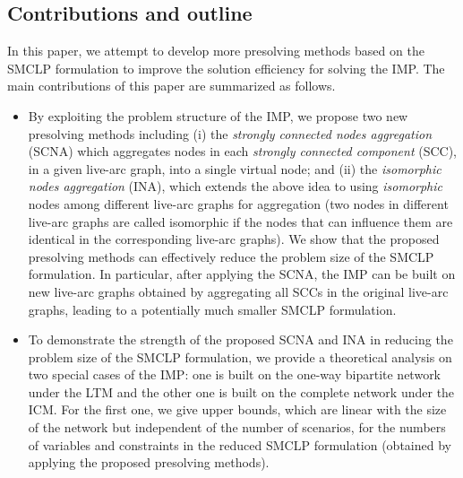 \documentclass[a4paper,10pt]{article}
\theoremstyle{plain}
\newcommand{\revv}[1]{{#1}}
\begin{document}
	
	
	\subsection{Contributions and outline}
	In this paper, we attempt to develop more presolving methods based on the SMCLP formulation to improve the solution efficiency for solving the IMP. 
	The main contributions of this paper are summarized as follows.
	\begin{itemize}
		\item 
		By exploiting the problem structure of the IMP, we propose two new presolving methods including (i) the \emph{strongly connected nodes aggregation} (SCNA) which aggregates nodes in each \emph{strongly connected component} (SCC), in a given live-arc graph, into a single virtual node; 
		and (ii) the \emph{isomorphic nodes aggregation} (INA), which extends the above idea to using \emph{isomorphic} nodes among different live-arc graphs for aggregation (two nodes in different live-arc graphs are called isomorphic if the nodes that can influence them are identical in the corresponding live-arc graphs).
		We show that the proposed presolving methods can effectively reduce the problem size of the SMCLP formulation. 
		In particular, after applying the SCNA, the IMP can be built on new live-arc graphs obtained by aggregating all SCCs in the original live-arc graphs, leading to a potentially much smaller SMCLP formulation.
		\item To demonstrate the strength of the proposed SCNA and INA in reducing the problem size of the SMCLP formulation, we provide a theoretical analysis on two special cases of the IMP: 
		one is built on the one-way bipartite \revv{network} under the LTM
		and the other one is built on the complete \revv{network} under the ICM.
		For the first one, we give upper bounds, which are  linear with the size of the \revv{network} but independent of the number of \revv{scenarios}, for the numbers of variables and constraints in the reduced SMCLP formulation (obtained by applying the proposed presolving methods).

\end{itemize}
\end{document}
